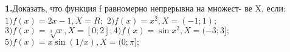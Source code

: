 \documentclass[12pt]{article}
\begin{document}
{ \linebreak
 \par \textbf{1.}Доказать, что функция f равномерно непрерывна на множест-\linebreak
ве X, если:\\
\indent$1) f(x) = 2x - 1, X = R;$ $2) f(x) = x^2, X = (-1;1);$\\
\indent$3) f(x) = \sqrt[3]{x}, X = [ 0;2]; 4) f(x) = \sin x^2, X = (-3;3];$ \\
\indent$5) f(x) = x\sin(1/x), X = (0; \pi];$\\
 \newpage
 \setlength{\headsep}{0.8cm}

\pagestyle{fancy}
\fancyhf{} 
\fancyhead[C]{\fontsize{14pt}{skip}\selectfont\itshape\rightmark}

}
\end{document}
